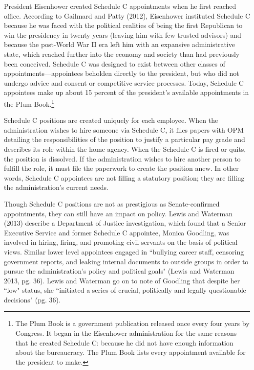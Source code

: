 \documentclass[12pt]{article}
\begin{document}
	
	President Eisenhower created Schedule C appointments when he first reached office. According to Gailmard and Patty (2012), Eisenhower instituted Schedule C because he was faced with the political realities of being the first Republican to win the presidency in twenty years (leaving him with few trusted advisors) and because the post-World War II era left him with an expansive administrative state, which reached further into the economy and society than had previously been conceived. Schedule C was designed to exist between other classes of appointments---appointees beholden directly to the president, but who did not undergo advice and consent or competitive service processes. Today, Schedule C appointees make up about 15 percent of the president's available appointments in the Plum Book.\footnote{The Plum Book is a government publication released once every four years by Congress. It began in the Eisenhower administration for the same reasons that he created Schedule C: because he did not have enough information about the bureaucracy. The Plum Book lists every appointment available for the president to make.}
	
	Schedule C positions are created uniquely for each employee. When the administration wishes to hire someone via Schedule C, it files papers with OPM detailing the responsibilities of the position to justify a particular pay grade and describes its role within the home agency. When the Schedule C is fired or quits, the position is dissolved. If the administration wishes to hire another person to fulfill the role, it must file the paperwork to create the position anew. In other words, Schedule C appointees are not filling a statutory position; they are filling the administration's current needs.	
	
	Though Schedule C positions are not as prestigious as Senate-confirmed appointments, they can still have an impact on policy. Lewis and Waterman (2013) describe a Department of Justice investigation, which found that a Senior Executive Service and former Schedule C appointee, Monica Goodling, was involved in hiring, firing, and promoting civil servants on the basis of political views. Similar lower level appointees engaged in ``bullying career staff, censoring government reports, and leaking internal documents to outside groups in order to pursue the administration's policy and political goals" (Lewis and Waterman 2013, pg. 36). Lewis and Waterman go on to note of Goodling that despite her ``low" status, she ``initiated a series of crucial, politically and legally questionable decisions" (pg. 36). 
	
\end{document}
